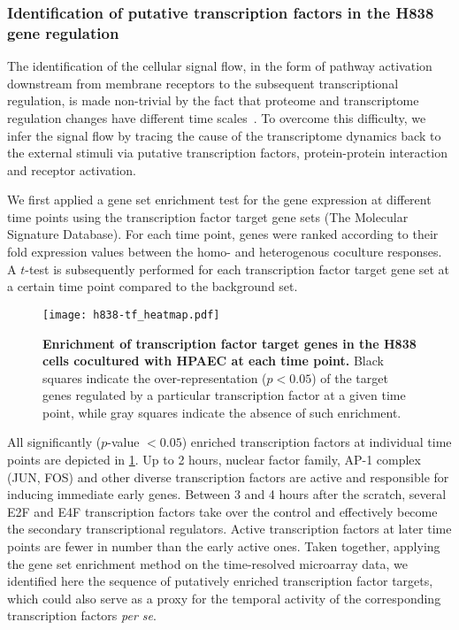 \subsubsection{Identification of putative transcription factors in the H838 gene regulation}

The identification of the cellular signal flow, in the form of pathway activation
downstream from membrane receptors to the subsequent 
transcriptional 
regulation, is made non-trivial by the fact that proteome 
and transcriptome regulation changes have different time scales~\citep{Busch2008}. 
To overcome this difficulty, we infer the signal flow by 
tracing the cause of the transcriptome dynamics back to the external stimuli via putative transcription factors, protein-protein interaction
and receptor activation. 

We first applied a gene set enrichment test for the gene expression at 
different time points using the transcription factor target gene sets (The Molecular Signature Database).
For each time point, 
genes were ranked according to their fold expression values
between the homo- and heterogenous coculture responses. 
A $t$-test is subsequently performed for each
transcription factor target gene set at a certain time 
point compared to the 
background set.

\begin{figure}[!ht]
\begin{center}
\texttt{[image: h838-tf\_heatmap.pdf]}
\end{center}
\caption[Enrichment of transcription factors]{
{\bf Enrichment of transcription factor target genes in
the H838 cells cocultured with HPAEC at each time point.} 
Black squares indicate the over-representation ($p<0.05$) of the  
target genes regulated by a particular transcription factor
at a given time point, while gray squares indicate the
absence of such enrichment.
}
\label{fig:h838_tf}
\end{figure}

All significantly ($p$-value $<0.05$) enriched 
transcription factors at individual time points are 
depicted in \ref{fig:h838_tf}. Up to 2 hours, nuclear
factor family, AP-1 complex (JUN, FOS) and other diverse
transcription factors are active and responsible for 
inducing immediate early genes. Between 3 and 4 hours after
the scratch, several E2F and E4F transcription factors take
over the control and effectively become the secondary 
transcriptional regulators. Active transcription factors
at later time points are fewer in number than the early 
active ones.
Taken together, applying the gene set
enrichment method on the time-resolved microarray data, we identified here the
sequence of putatively enriched transcription factor targets, which could also serve as
a proxy for the temporal activity of the corresponding 
transcription factors \emph{per se}.

